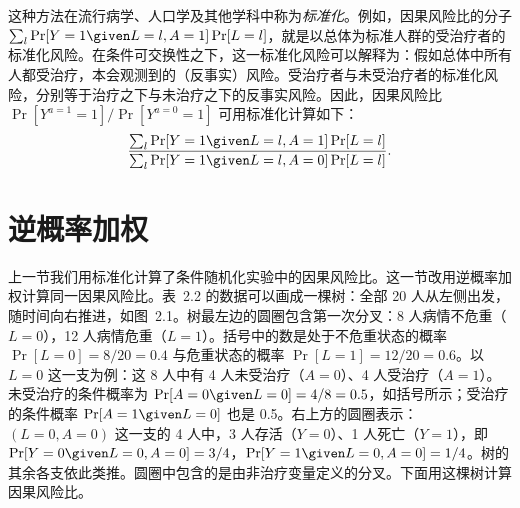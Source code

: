 这种方法在流行病学、人口学及其他学科中称为\emph{标准化}。例如，因果风险比的分子 $\sum_l\Pr[Y=1\given L=l,A=1]\Pr[L=l]$，就是以总体为标准人群的受治疗者的标准化风险。在条件可交换性之下，这一标准化风险可以解释为：假如总体中所有人都受治疗，本会观测到的（反事实）风险。受治疗者与未受治疗者的标准化风险，分别等于治疗之下与未治疗之下的反事实风险。因此，因果风险比 $\Pr[Y^{a=1}=1]/\Pr[Y^{a=0}=1]$ 可用标准化计算如下：
\[
\frac{\sum_l\Pr[Y=1\given L=l,A=1]\Pr[L=l]}{\sum_l\Pr[Y=1\given L=l,A=0]\Pr[L=l]}.
\]

\section{逆概率加权}

上一节我们用标准化计算了条件随机化实验中的因果风险比。这一节改用逆概率加权计算同一因果风险比。表~2.2 的数据可以画成一棵树：全部 20 人从左侧出发，随时间向右推进，如图~2.1。树最左边的圆圈包含第一次分叉：8 人病情不危重（$L=0$），12 人病情危重（$L=1$）。括号中的数是处于不危重状态的概率 $\Pr[L=0]=8/20=0.4$ 与危重状态的概率 $\Pr[L=1]=12/20=0.6$。以 $L=0$ 这一支为例：这 8 人中有 4 人未受治疗（$A=0$）、4 人受治疗（$A=1$）。未受治疗的条件概率为 $\Pr[A=0\given L=0]=4/8=0.5$，如括号所示；受治疗的条件概率 $\Pr[A=1\given L=0]$ 也是 0.5。右上方的圆圈表示：$(L=0,A=0)$ 这一支的 4 人中，3 人存活（$Y=0$）、1 人死亡（$Y=1$），即 $\Pr[Y=0\given L=0,A=0]=3/4$，$\Pr[Y=1\given L=0,A=0]=1/4$。树的其余各支依此类推。圆圈中包含的是由非治疗变量定义的分叉。下面用这棵树计算因果风险比。


